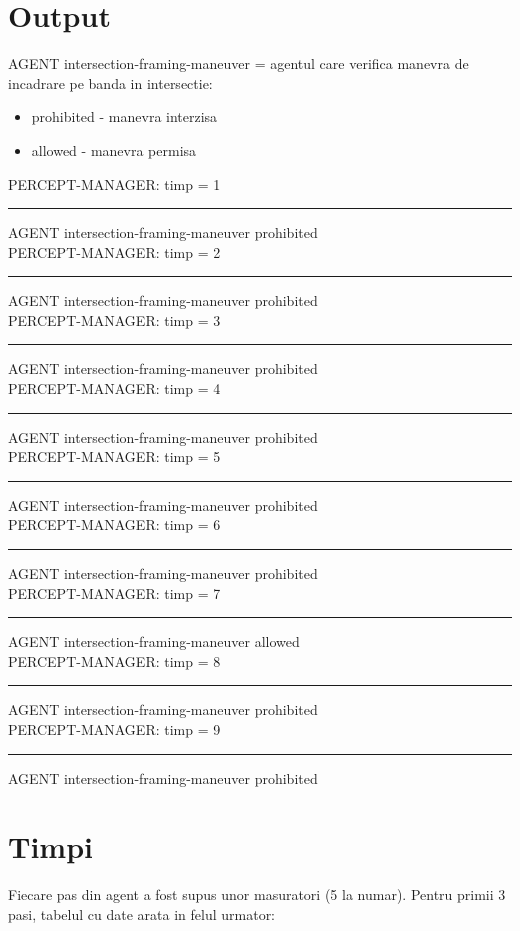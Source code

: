 \documentclass[a4paper,12pt]{report}
\begin{document}
\section{Output}
AGENT intersection-framing-maneuver = agentul care verifica manevra de incadrare pe banda in intersectie: \\
\begin{itemize}
    \item prohibited - manevra interzisa
    \item allowed - manevra permisa
\end{itemize}
PERCEPT-MANAGER: timp = 1 \\
\rule{1cm} *AGENT intersection-framing-maneuver prohibited \\
 PERCEPT-MANAGER: timp = 2 \\
\rule{1cm} *AGENT intersection-framing-maneuver prohibited \\
PERCEPT-MANAGER: timp = 3 \\
\rule{1cm} *AGENT intersection-framing-maneuver prohibited \\
PERCEPT-MANAGER: timp = 4 \\
\rule{1cm} *AGENT intersection-framing-maneuver prohibited \\
PERCEPT-MANAGER: timp = 5 \\
\rule{1cm} *AGENT intersection-framing-maneuver prohibited \\
PERCEPT-MANAGER: timp = 6 \\
\rule{1cm} *AGENT intersection-framing-maneuver prohibited \\
PERCEPT-MANAGER: timp = 7 \\
\rule{1cm} *AGENT intersection-framing-maneuver allowed \\
PERCEPT-MANAGER: timp = 8 \\
\rule{1cm} *AGENT intersection-framing-maneuver prohibited \\
PERCEPT-MANAGER: timp = 9 \\
\rule{1cm} *AGENT intersection-framing-maneuver prohibited \\

\newpage

\section{Timpi}
Fiecare pas din agent a fost supus unor masuratori (5 la numar). Pentru primii 3 pasi, tabelul cu date arata in felul urmator:\\
\end{document}
